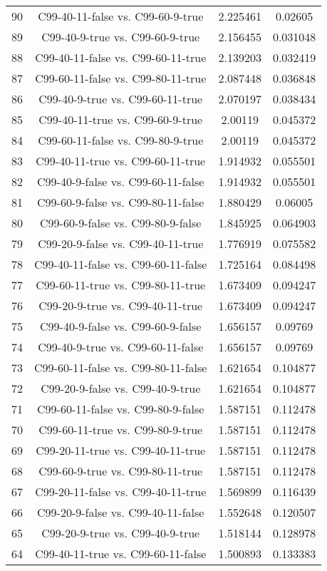 \documentclass[a4paper,10pt]{article}
\begin{document}
\begin{landscape}
\begin{table}[!htp]
\begin{tabular}{cccc}
90&C99-40-11-false vs. C99-60-9-true&2.225461&0.02605\\
89&C99-40-9-true vs. C99-60-9-true&2.156455&0.031048\\
88&C99-40-11-false vs. C99-60-11-true&2.139203&0.032419\\
87&C99-60-11-false vs. C99-80-11-true&2.087448&0.036848\\
86&C99-40-9-true vs. C99-60-11-true&2.070197&0.038434\\
85&C99-40-11-true vs. C99-60-9-true&2.00119&0.045372\\
84&C99-60-11-false vs. C99-80-9-true&2.00119&0.045372\\
83&C99-40-11-true vs. C99-60-11-true&1.914932&0.055501\\
82&C99-40-9-false vs. C99-60-11-false&1.914932&0.055501\\
81&C99-60-9-false vs. C99-80-11-false&1.880429&0.06005\\
80&C99-60-9-false vs. C99-80-9-false&1.845925&0.064903\\
79&C99-20-9-false vs. C99-40-11-true&1.776919&0.075582\\
78&C99-40-11-false vs. C99-60-11-false&1.725164&0.084498\\
77&C99-60-11-true vs. C99-80-11-true&1.673409&0.094247\\
76&C99-20-9-true vs. C99-40-11-true&1.673409&0.094247\\
75&C99-40-9-false vs. C99-60-9-false&1.656157&0.09769\\
74&C99-40-9-true vs. C99-60-11-false&1.656157&0.09769\\
73&C99-60-11-false vs. C99-80-11-false&1.621654&0.104877\\
72&C99-20-9-false vs. C99-40-9-true&1.621654&0.104877\\
71&C99-60-11-false vs. C99-80-9-false&1.587151&0.112478\\
70&C99-60-11-true vs. C99-80-9-true&1.587151&0.112478\\
69&C99-20-11-true vs. C99-40-11-true&1.587151&0.112478\\
68&C99-60-9-true vs. C99-80-11-true&1.587151&0.112478\\
67&C99-20-11-false vs. C99-40-11-true&1.569899&0.116439\\
66&C99-20-9-false vs. C99-40-11-false&1.552648&0.120507\\
65&C99-20-9-true vs. C99-40-9-true&1.518144&0.128978\\
64&C99-40-11-true vs. C99-60-11-false&1.500893&0.133383\\

\end{tabular}
\end{table}
\end{landscape}
\end{document}

